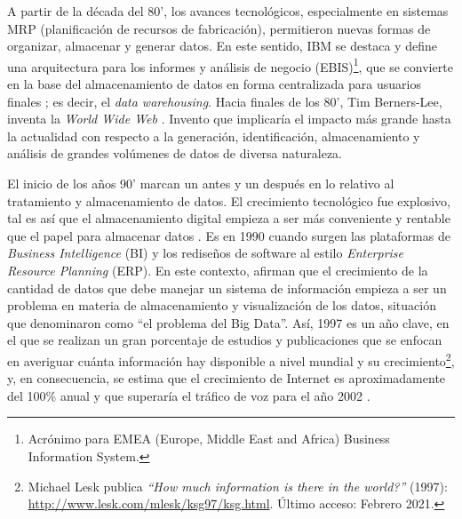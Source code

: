 \bigskip A partir de la década del 80’, los avances tecnológicos, especialmente en sistemas MRP (planificación de recursos de fabricación), permitieron nuevas formas de organizar, almacenar y generar datos. En este sentido, IBM se destaca y define una arquitectura para los informes y análisis de negocio (EBIS)\footnote{Acrónimo para EMEA (Europe, Middle East and Africa) Business Information System.}, que se convierte en la base del almacenamiento de datos en forma centralizada para usuarios finales \citep{devlin1988architecture}; es decir, el \textit{data warehousing}. Hacia finales de los 80’, Tim Berners-Lee, inventa la \textit{World Wide Web} \citep{berners1992world}. Invento que implicaría el impacto más grande hasta la actualidad con respecto a la generación, identificación, almacenamiento y análisis de grandes volúmenes de datos de diversa naturaleza.

\bigskip El inicio de los años 90’ marcan un antes y un después en lo relativo al tratamiento y almacenamiento de datos. El crecimiento tecnológico fue explosivo, tal es así que el almacenamiento digital empieza a ser más conveniente y rentable que el papel para almacenar datos \citep{morris2003evolution}. Es en 1990 cuando surgen las plataformas de \textit{Business Intelligence} (BI) y los rediseños de software al estilo \textit{Enterprise Resource Planning} (ERP). En este contexto, \cite{cox1997application} afirman que el crecimiento de la cantidad de datos que debe manejar un sistema de información empieza a ser un problema en materia de almacenamiento y visualización de los datos, situación que denominaron como “el problema del Big Data”. Así, 1997 es un año clave, en el que se realizan un gran porcentaje de estudios y publicaciones que se enfocan en averiguar cuánta información hay disponible a nivel mundial y su crecimiento\footnote{Michael Lesk publica \textit{“How much information is there in the world?”} (1997): \url{http://www.lesk.com/mlesk/ksg97/ksg.html}. Último acceso: Febrero 2021.}, y, en consecuencia, se estima que el crecimiento de Internet es aproximadamente del 100\% anual y que superaría el tráfico de voz para el año 2002 \citep{coffman1998size}.

